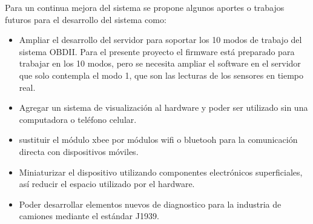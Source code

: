 Para un continua mejora del sistema se propone algunos aportes o trabajos futuros para el desarrollo del sistema como: 
\begin{itemize}
    \item Ampliar el desarrollo del servidor para soportar los 10 modos de trabajo del sistema OBDII. Para el presente proyecto el firmware está preparado para trabajar en los 10 modos, pero se necesita ampliar el software en el servidor que solo contempla el modo 1, que son las lecturas de los sensores en tiempo real. 
    \item Agregar un sistema de visualización al hardware y poder ser utilizado sin una computadora o teléfono celular. 
    \item sustituir el módulo xbee por módulos wifi o bluetooh para la comunicación directa con dispositivos móviles. 
    \item Miniaturizar el dispositivo utilizando componentes electrónicos superficiales, así reducir el espacio utilizado por el hardware. 
    \item Poder desarrollar elementos nuevos de diagnostico para la industria de camiones mediante el estándar J1939. 
\end{itemize}






	

	

	

